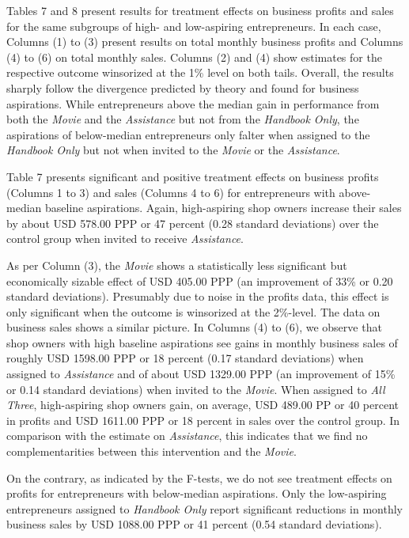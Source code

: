 \documentclass[11.5pt]{article}
\begin{document}
Tables 7 and 8 present results for treatment effects on business profits and sales for the same subgroups of high- and low-aspiring entrepreneurs. In each case, Columns (1) to (3) present results on total monthly business profits and Columns (4) to (6) on total monthly sales. Columns (2) and (4) show estimates for the respective outcome winsorized at the 1\% level on both tails. Overall, the results sharply follow the divergence predicted by theory and found for business aspirations. While entrepreneurs above the median gain in performance from both the \emph{Movie} and the \emph{Assistance} but not from the \emph{Handbook Only}, the aspirations of below-median entrepreneurs only falter when assigned to the \emph{Handbook Only} but not when invited to the \emph{Movie} or the \emph{Assistance}.

Table 7 presents significant and positive treatment effects on business profits (Columns 1 to 3) and sales (Columns 4 to 6) for entrepreneurs with above-median baseline aspirations. Again, high-aspiring shop owners increase their sales by about USD 578.00 PPP or 47 percent (0.28 standard deviations) over the control group when invited to receive \emph{Assistance}.

As per Column (3), the \emph{Movie} shows a statistically less significant but economically sizable effect of USD 405.00 PPP (an improvement of 33\% or 0.20 standard deviations). Presumably due to noise in the profits data, this effect is only significant when the outcome is winsorized at the 2\%-level. The data on business sales shows a similar picture. In Columns (4) to (6), we observe that shop owners with high baseline aspirations see gains in monthly business sales of roughly USD 1598.00 PPP or 18 percent (0.17 standard deviations) when assigned to \emph{Assistance} and of about USD 1329.00 PPP (an improvement of 15\% or 0.14 standard deviations) when invited to the \emph{Movie}. When assigned to \emph{All Three}, high-aspiring shop owners gain, on average, USD 489.00 PP or 40 percent in profits and USD 1611.00 PPP or 18 percent in sales over the control group. In comparison with the estimate on \emph{Assistance}, this indicates that we find no complementarities between this intervention and the \emph{Movie}.

On the contrary, as indicated by the F-tests, we do not see treatment effects on profits for entrepreneurs with below-median aspirations. Only the low-aspiring entrepreneurs assigned to \emph{Handbook Only} report significant reductions in monthly business sales by USD 1088.00 PPP or 41 percent (0.54 standard deviations).
\end{document}

